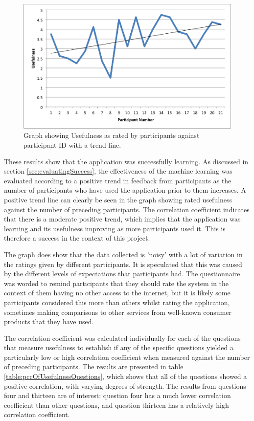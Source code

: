 \documentclass[authoryearcitations]{UoYCSproject}
\begin{document}
\begin{figure}[htb] 
\includegraphics[width=\linewidth]{usefulnessTrend}
\caption{Graph showing Usefulness as rated by participants against participant ID with a trend line.}
\label{fig:usefulnessTrend}
\end{figure}

These results show that the application was successfully learning. As discussed in section \ref{sec:evaluatingSuccess}, the effectiveness of the machine learning was evaluated according to a positive trend in feedback from participants as the number of participants who have used the application prior to them increases. A positive trend line can clearly be seen in the graph showing rated usefulness against the number of preceding participants. The correlation coefficient indicates that there is a moderate positive trend, which implies that the application was learning and its usefulness improving as more participants used it. This is therefore a success in the context of this project.

The graph does show that the data collected is 'noisy' with a lot of variation in the ratings given by different participants. It is speculated that this was caused by the different levels of expectations that participants had. The questionnaire was worded to remind participants that they should rate the system in the context of them having no other access to the internet, but it is likely some participants considered this more than others whilst rating the application, sometimes making comparisons to other services from well-known consumer products that they have used.

The correlation coefficient was calculated individually for each of the questions that measure usefulness to establish if any of the specific questions yielded a particularly low or high correlation coefficient when measured against the number of preceding participants. The results are presented in table \ref{table:pccOfUsefulnessQuestions}, which shows that all of the questions showed a positive correlation, with varying degrees of strength. The results from questions four and thirteen are of interest: question four has a much lower correlation coefficient than other questions, and question thirteen has a relatively high correlation coefficient. 
\end{document}
